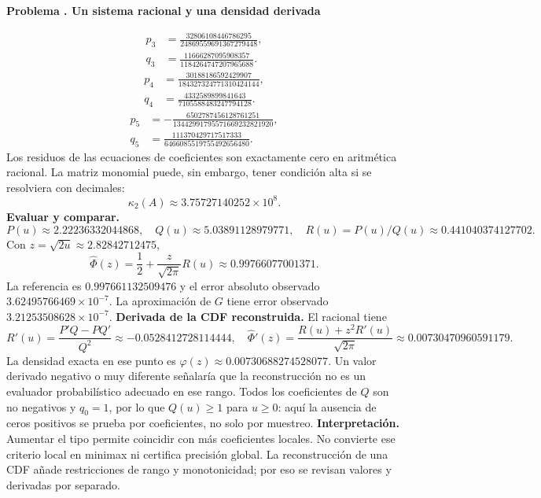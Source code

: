 \documentclass[11pt,a4paper]{article}
\theoremstyle{definition}
\newcounter{problema}
\newenvironment{resuelto}[1]{\refstepcounter{problema}\par\medskip\Needspace{6\baselineskip}\textbf{Problema \theproblema. #1}\par}{\par\medskip}
\begin{document}
\begin{resuelto}{Un sistema racional y una densidad derivada}
\[\]
\[
\begin{aligned}p_3&=\frac{32806108446786295}{24869559691367279448},\\q_3&=\frac{11666287095908357}{1184264747207965688}.\end{aligned}
\]
\[
\begin{aligned}p_4&=\frac{30188186592429907}{184327324771310424144},\\q_4&=\frac{4332589899841643}{7105588483247794128}.\end{aligned}
\]
\[
\begin{aligned}p_5&=-\frac{6502787456128761251}{13442991795571669232821920},\\q_5&=\frac{111370429717517333}{6466085519755492656480}.\end{aligned}
\]
Los residuos de las ecuaciones de coeficientes son exactamente cero en aritmética racional. La matriz monomial puede, sin embargo, tener condición alta si se resolviera con decimales:
\[
\kappa_2(A)\approx3.75727140252\times10^{8}.
\]
\textbf{Evaluar y comparar.}
\[
P(u)\approx2.22236332044868,\quad Q(u)\approx5.03891128979771,\quad R(u)=P(u)/Q(u)\approx0.441040374127702.
\]
Con $z=\sqrt{2u}\approx2.82842712475$,
\[
\widehat\Phi(z)=\frac12+\frac z{\sqrt{2\pi}}R(u)\approx0.99766077001371.
\]
La referencia es $0.997661132509476$ y el error absoluto observado $3.62495766469\times10^{-7}$. La aproximación de $G$ tiene error observado $3.21253508628\times10^{-7}$.
\textbf{Derivada de la CDF reconstruida.} El racional tiene
\[
R\prime(u)=\frac{P\prime Q-PQ\prime}{Q^2}\approx-0.0528412728114444,\quad
\widehat\Phi\prime(z)=\frac{R(u)+z^2R\prime(u)}{\sqrt{2\pi}}\approx0.00730470960591179.
\]
La densidad exacta en ese punto es $\varphi(z)\approx0.00730688274528077$. Un valor derivado negativo o muy diferente señalaría que la reconstrucción no es un evaluador probabilístico adecuado en ese rango.
Todos los coeficientes de $Q$ son no negativos y $q_0=1$, por lo que $Q(u)\ge1$ para $u\ge0$: aquí la ausencia de ceros positivos se prueba por coeficientes, no solo por muestreo.
\textbf{Interpretación.} Aumentar el tipo permite coincidir con más coeficientes locales. No convierte ese criterio local en minimax ni certifica precisión global. La reconstrucción de una CDF añade restricciones de rango y monotonicidad; por eso se revisan valores y derivadas por separado.
\end{resuelto}
\end{document}
